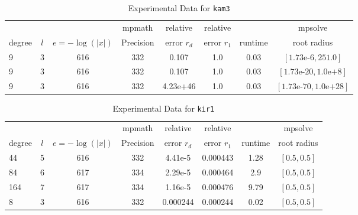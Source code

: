 \documentclass[sigconf]{acmart}
\begin{document}
\begin{table}[t]
\caption{Experimental Data for \texttt{kam3}} %
\label{tab:kam3}
\vskip -0.15in
\begin{center}
\begin{small}
\begin{sc}
\begin{tabular}{lccccccc}
\toprule
&  &  & mpmath & relative  & relative &  & mpsolve \\
degree  & $l$& $e=-\log(|x|)$& Precision &error $r_d$       & error $r_1$ &runtime& root radius\\
\midrule
 9 & 3 & 616 & 332 & 0.107 & 1.0 & 0.03 & $[1.73\text{e-}6, 251.0]$\\
 9 & 3 & 616 & 332 & 0.107 & 1.0 & 0.03 & $[1.73\text{e-}20, 1.0\text{e+}8]$\\
 9 & 3 & 616 & 332 & 4.23e+46 & 1.0 & 0.03 & $[1.73\text{e-}70, 1.0\text{e+}28]$\\
\bottomrule
\end{tabular}
\end{sc}
\end{small}
\end{center}
\vskip 0.05in
\end{table}

\begin{table}[t]
\caption{Experimental Data for \texttt{kir1}} %
\label{tab:kir1}
\vskip -0.15in
\begin{center}
\begin{small}
\begin{sc}
\begin{tabular}{lccccccc}
\toprule
&  &  & mpmath & relative  & relative &  & mpsolve \\
degree  & $l$& $e=-\log(|x|)$& Precision &error $r_d$       & error $r_1$ &runtime& root radius\\
\midrule
 44 & 5 & 616 & 332 & 4.41e-5 & 0.000443 & 1.28 & $[0.5, 0.5]$\\
  84 & 6 & 617 & 334 & 2.29e-5 & 0.000464 & 2.9 & $[0.5, 0.5]$\\
 164 & 7 & 617 & 334 & 1.16e-5 & 0.000476 & 9.79 & $[0.5, 0.5]$\\
 8 & 3 & 616 & 332 & 0.000244 & 0.000244 & 0.02 & $[0.5, 0.5]$\\ %
\bottomrule
\end{tabular}
\end{sc}
\end{small}
\end{center}
\vskip 0.05in
\end{table}
\end{document}
